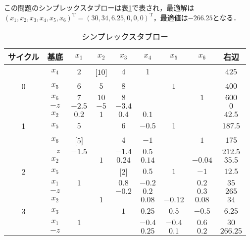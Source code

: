 \documentclass{jsreport}
\begin{document}
この問題のシンプレックスタブローは表\ref{tab:change_ex}で表され，最適解は$(x_1, x_2, x_3, x_4, x_5, x_6)^{\mathrm{T}}
= (30, 34, 6.25, 0, 0, 0)^{\mathrm{T}}$，最適値は$-266.25$となる．
\begin{table}[tb]
  \centering
    \caption{シンプレックスタブロー}
    \begin{tabular}{c|c|cccccc|c}
    サイクル & 基底     & $x_1$ & $x_2$ & $x_3$ & $x_4$ & $x_5$ & $x_6$ & 右辺  \\ \hline
            & $x_4$ & $2$   & [$10$]&$4$   & $1$  &       &       & $425$ \\
       0    & $x_5$ & $6$   & $5$   & $8$   &       & $1$   &       & $400$ \\
            & $x_6$ & $7$   & $10$  & $8$   &       &       & $1$   & $600$ \\ \cline{2-9}
            & $-z$  & $-2.5$& $-5$  & $-3.4$&       &       &       & $0$\\ \hline

            & $x_2$ & $0.2$ & $1$   &$0.4$  & $0.1$ &       &       & $42.5$ \\
       1    & $x_5$ & $5$   &       & $6$   & $-0.5$& $1$   &       & $187.5$ \\
            & $x_6$ & [$5$] &       & $4$   & $-1$  &       & $1$   & $175$ \\ \cline{2-9}
            & $-z$  & $-1.5$&       & $-1.4$& $0.5$ &       &       & $212.5$\\ \hline

            & $x_2$ &       & $1$   &$0.24$ & $0.14$&       & $-0.04$& $35.5$ \\
       2    & $x_5$ &       &       & [$2$] & $0.5$ & $1$   & $-1$  & $12.5$ \\
            & $x_1$ & $1$   &       & $0.8$ & $-0.2$&       & $0.2$ & $35$ \\ \cline{2-9}
            & $-z$  &       &       & $-0.2$& $0.2$ &       & $0.3$ & $265$\\ \hline

            & $x_2$ &       & $1$   &       & $0.08$& $-0.12$& $0.08$& $34$ \\
       3    & $x_3$ &       &       & $1$   & $0.25$ & $0.5$& $-0.5$ & $6.25$ \\
            & $x_1$ & $1$   &       &       & $-0.4$& $-0.4$& $0.6$ & $30$ \\ \cline{2-9}
            & $-z$  &       &       & & $0.25$ &  $0.1$     & $0.2$ & $266.25$\\ \hline
    \end{tabular}
    \label{tab:change_ex}
\end{table}
\end{document}
